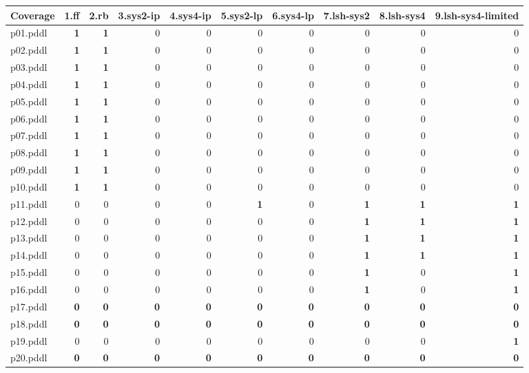 \documentclass{article}
\begin{document}
\begin{tabular}{@{}lrrrrrrrrr@{}}
Coverage & 1.ff & 2.rb & 3.sys2-ip & 4.sys4-ip & 5.sys2-lp & 6.sys4-lp & 7.lsh-sys2 & 8.lsh-sys4 & 9.lsh-sys4-limited \\
\midrule
p01.pddl & \textbf{1} & \textbf{1} & 0 & 0 & 0 & 0 & 0 & 0 & 0 \\
p02.pddl & \textbf{1} & \textbf{1} & 0 & 0 & 0 & 0 & 0 & 0 & 0 \\
p03.pddl & \textbf{1} & \textbf{1} & 0 & 0 & 0 & 0 & 0 & 0 & 0 \\
p04.pddl & \textbf{1} & \textbf{1} & 0 & 0 & 0 & 0 & 0 & 0 & 0 \\
p05.pddl & \textbf{1} & \textbf{1} & 0 & 0 & 0 & 0 & 0 & 0 & 0 \\
p06.pddl & \textbf{1} & \textbf{1} & 0 & 0 & 0 & 0 & 0 & 0 & 0 \\
p07.pddl & \textbf{1} & \textbf{1} & 0 & 0 & 0 & 0 & 0 & 0 & 0 \\
p08.pddl & \textbf{1} & \textbf{1} & 0 & 0 & 0 & 0 & 0 & 0 & 0 \\
p09.pddl & \textbf{1} & \textbf{1} & 0 & 0 & 0 & 0 & 0 & 0 & 0 \\
p10.pddl & \textbf{1} & \textbf{1} & 0 & 0 & 0 & 0 & 0 & 0 & 0 \\
p11.pddl & 0 & 0 & 0 & 0 & \textbf{1} & 0 & \textbf{1} & \textbf{1} & \textbf{1} \\
p12.pddl & 0 & 0 & 0 & 0 & 0 & 0 & \textbf{1} & \textbf{1} & \textbf{1} \\
p13.pddl & 0 & 0 & 0 & 0 & 0 & 0 & \textbf{1} & \textbf{1} & \textbf{1} \\
p14.pddl & 0 & 0 & 0 & 0 & 0 & 0 & \textbf{1} & \textbf{1} & \textbf{1} \\
p15.pddl & 0 & 0 & 0 & 0 & 0 & 0 & \textbf{1} & 0 & \textbf{1} \\
p16.pddl & 0 & 0 & 0 & 0 & 0 & 0 & \textbf{1} & 0 & \textbf{1} \\
p17.pddl & \textbf{0} & \textbf{0} & \textbf{0} & \textbf{0} & \textbf{0} & \textbf{0} & \textbf{0} & \textbf{0} & \textbf{0} \\
p18.pddl & \textbf{0} & \textbf{0} & \textbf{0} & \textbf{0} & \textbf{0} & \textbf{0} & \textbf{0} & \textbf{0} & \textbf{0} \\
p19.pddl & 0 & 0 & 0 & 0 & 0 & 0 & 0 & 0 & \textbf{1} \\
p20.pddl & \textbf{0} & \textbf{0} & \textbf{0} & \textbf{0} & \textbf{0} & \textbf{0} & \textbf{0} & \textbf{0} & \textbf{0} \\
\end{tabular}
\end{document}
